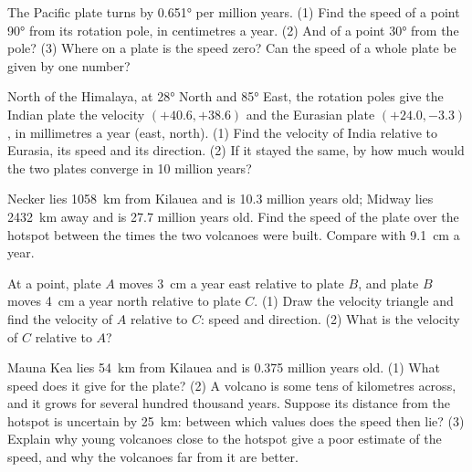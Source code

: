 \begin{exercise}[$\star\star$]\label{exo:g11:plate-motions:8}
The Pacific plate turns by \ang{0.651} per million years. (1) Find the speed
of a point \ang{90} from its rotation pole, in centimetres a year. (2) And of
a point \ang{30} from the pole? (3) Where on a plate is the speed zero? Can
the speed of a whole plate be given by one number?
\end{exercise}

\begin{exercise}[$\star\star$]\label{exo:g11:plate-motions:9}
North of the Himalaya, at \ang{28} North and \ang{85} East, the rotation poles
give the Indian plate the velocity $(+40.6, +38.6)$ and the Eurasian plate
$(+24.0, -3.3)$, in millimetres a year (east, north). (1) Find the velocity of
India relative to Eurasia, its speed and its direction. (2) If it stayed the
same, by how much would the two plates converge in 10 million years?
\end{exercise}

\begin{exercise}[$\star\star$]\label{exo:g11:plate-motions:10}
Necker lies \qty{1058}{km} from Kilauea and is \num{10.3} million years old;
Midway lies \qty{2432}{km} away and is \num{27.7} million years old. Find the
speed of the plate over the hotspot between the times the two volcanoes were
built. Compare with \qty{9.1}{cm} a year.
\end{exercise}

\begin{exercise}[$\star\star$]\label{exo:g11:plate-motions:11}
At a point, plate $A$ moves \qty{3}{cm} a year east relative to plate $B$,
and plate $B$ moves \qty{4}{cm} a year north relative to plate $C$.
(1) Draw the velocity triangle and find the velocity of $A$ relative to $C$:
speed and direction. (2) What is the velocity of $C$ relative to $A$?
\end{exercise}

\begin{exercise}[$\star\star\star$]\label{exo:g11:plate-motions:12}
Mauna Kea lies \qty{54}{km} from Kilauea and is \num{0.375} million years
old. (1) What speed does it give for the plate? (2) A volcano is some tens of
kilometres across, and it grows for several hundred thousand years. Suppose
its distance from the hotspot is uncertain by \qty{25}{km}: between which
values does the speed then lie? (3) Explain why young volcanoes close to the
hotspot give a poor estimate of the speed, and why the volcanoes far from it
are better.
\end{exercise}

